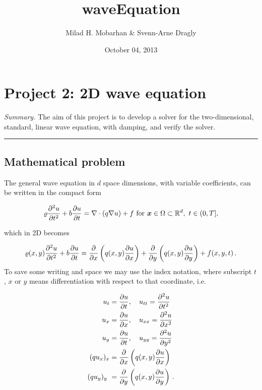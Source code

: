 \documentclass[letterpaper,10pt,english]{/usr/share/sphinx/texinputs/sphinxhowto}
\title{waveEquation}
\date{October 04, 2013}
\author{Milad H. Mobarhan \& Svenn-Arne Dragly}
\begin{document}
        
            \maketitle
        

        


        
        \section{Project 2: 2D wave equation}

\emph{Summary.} The aim of this project is to develop a solver for the
two-dimensional, standard, linear wave equation, with damping, and
verify the solver.\begin{center}\rule{3in}{0.4pt}\end{center}

\subsection{Mathematical problem}

The general wave equation in $d$ space dimensions, with variable
coefficients, can be written in the compact form

\[
\varrho\frac{\partial^2 u}{\partial t^2} +b \frac{\partial u}{\partial t} = \nabla\cdot (q\nabla u) + f\hbox{ for }\boldsymbol{x}\in\Omega\subset\mathbb{R}^d,\ t\in (0,T],
\]

which in 2D becomes

\[
\varrho(x,y)
\frac{\partial^2 u}{\partial t^2} +b \frac{\partial u}{\partial t} =
\frac{\partial}{\partial x}\left( q(x,y)
\frac{\partial u}{\partial x}\right)
+
\frac{\partial}{\partial y}\left( q(x,y)
\frac{\partial u}{\partial y}\right)
+ f(x,y,t)
\thinspace .
\] To save some writing and space we may use the index notation, where
subscript $t$, $x$ or $y$ means differentiation with respect to that
coordinate, i.e.

\begin{align*}
u_{t} &=\frac{\partial u}{\partial t} ,
\quad u_{tt} =\frac{\partial^2 u}{\partial t^2}\\
u_{x} &=\frac{\partial u}{\partial x} ,
\quad u_{xx} =\frac{\partial^2 u}{\partial x^2}\\
u_{y} &=\frac{\partial u}{\partial t} ,
\quad u_{yy} =\frac{\partial^2 u}{\partial y^2}\\
(q u_x)_x &= \frac{\partial}{\partial x}\left( q(x,y)
\frac{\partial u}{\partial x}\right)
\\
(q u_y)_y\ &=\frac{\partial}{\partial y}\left( q(x,y)
\frac{\partial u}{\partial y}\right)
\thinspace .
\end{align*}
\end{document}
